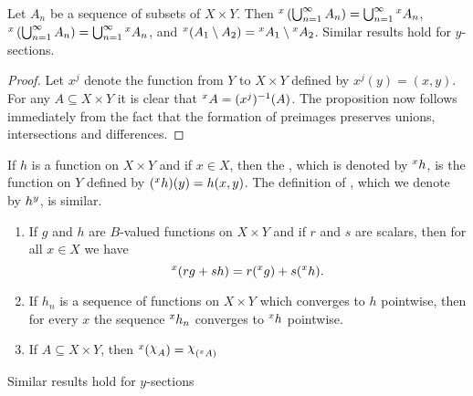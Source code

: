 \begin{proposition}\label{prop:section preserve union intersection}
Let $A_n$ be a sequence of subsets of $X\times Y$. Then $\xsec{\br{\bigcup_{n=1}^\infty A_n}}{x}=\bigcup_{n=1}^\infty\xsec{A_n}{x}$, $\xsec{\br{\bigcup_{n=1}^\infty A_n}}{x}=\bigcup_{n=1}^\infty\xsec{A_n}{x}$, and $\xsec{(A_1\sd A_2)}{x}=\xsec{A_1}{x}\sd\xsec{A_2}{x}$. Similar results hold for $y$-sections.
\end{proposition}

\begin{proof}
Let $x^j$ denote the function from $Y$ to $X\times Y$ defined by $x^j(y)=(x, y)$. For any $A\subseteq X\times Y$ it is clear that $\xsec{A}{x}=(x^j)^{-1}(A)$. The proposition now follows immediately from the fact that the formation of preimages preserves unions, intersections and differences.
\end{proof}


\begin{definition}
If $h$ is a function on $X\times Y$ and if $x\in X$, then the , which is denoted by $\xsec{h}{x}$, is the function on $Y$ defined by $(\xsec{h}{x})(y)=h(x, y)$. The definition of , which we denote by $\ysec{h}{y}$, is similar.
\end{definition}

\begin{proposition}\label{prop:section basic properties}
\begin{enumerate}
    \item\label{prop:item:section linear}
    If $g$ and $h$ are $B$-valued functions on $X\times Y$ and if $r$ and $s$ are scalars, then for all $x\in X$ we have \[\xsec{(rg+sh)}{x}=r(\xsec{g}{x})+s(\xsec{h}{x}).\]

    \item\label{prop:item:section limit}
    If $h_n$ is a sequence of functions on $X\times Y$ which converges to $h$ pointwise, then for every $x$ the sequence $\xsec{h_n}{x}$ converges to $\xsec{h}{x}$ pointwise.
    
    \item\label{prop:item:section of idf}
    If $A\subseteq X\times Y$, then $\xsec{(\idf{A})}{x}=\idf{(\xsec{A}{x})}$
\end{enumerate}

Similar results hold for $y$-sections
\end{proposition}


